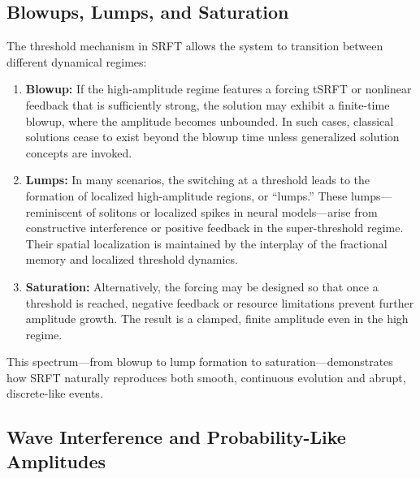 \documentclass[12pt]{article}
\begin{document}
\medskip

\subsection{Blowups, Lumps, and Saturation}
\label{subsec:blowups_lumps_saturation}

The threshold mechanism in SRFT allows the system to transition between different dynamical regimes:
\begin{enumerate}
    \item \textbf{Blowup:}  
          If the high-amplitude regime features a forcing tSRFT or nonlinear feedback that is sufficiently strong, the solution may exhibit a finite-time blowup, where the amplitude becomes unbounded. In such cases, classical solutions cease to exist beyond the blowup time unless generalized solution concepts are invoked.
    \item \textbf{Lumps:}  
          In many scenarios, the switching at a threshold leads to the formation of localized high-amplitude regions, or “lumps.” These lumps—reminiscent of solitons or localized spikes in neural models—arise from constructive interference or positive feedback in the super-threshold regime. Their spatial localization is maintained by the interplay of the fractional memory and localized threshold dynamics.
    \item \textbf{Saturation:}  
          Alternatively, the forcing may be designed so that once a threshold is reached, negative feedback or resource limitations prevent further amplitude growth. The result is a clamped, finite amplitude even in the high regime.
\end{enumerate}
This spectrum—from blowup to lump formation to saturation—demonstrates how SRFT naturally reproduces both smooth, continuous evolution and abrupt, discrete-like events.

\medskip

\subsection{Wave Interference and Probability-Like Amplitudes}
\label{subsec:wave_interference_amplitudes}
\end{document}
